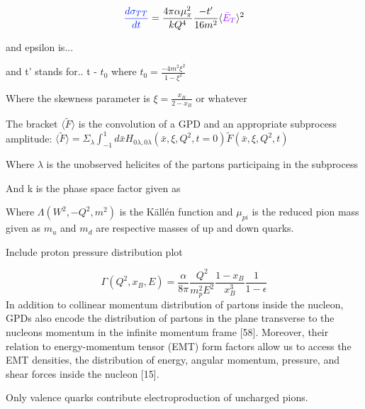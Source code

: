     
    \begin{equation}
        \textcolor{sigmaTT}{\frac{d\sigma_{TT}}{dt}} = 
        \frac{4\pi\alpha \mu_{\pi}^2}{kQ^4}
        \frac{-t'}{16m^2}
        \langle \GPDETbarEQ \rangle^2   
    \end{equation} 
        
    

    and epsilon is... 
    
    and t' stands for.. t - $t_0$ where $t_0 = \frac{-4m^2\xi^2}{1-\xi^2}$
    
    
    Where the skewness parameter is $\xi = \frac{x_B}{2-x_B}$ or whatever
    

    The bracket $\langle \tilde{F} \rangle$ is the convolution of a GPD and an appropriate subprocess amplitude:
    $
    \langle \tilde{F} \rangle =  \Sigma_{\lambda} \int_{-1}^{1} d\bar{x}H_{0\lambda,0\lambda}\left( \bar{x}, \xi, Q^2, t=0  \right)\tilde{F}\left( \bar{x}, \xi, Q^2, t  \right)\   
    $ 


    Where $\lambda$ is the unobserved helicites of the partons participaing in the subprocess
    
    
    
    
    And k is the phase space factor given as 
     \scalebox{0.7}{%
     $           k = 16\pi \left( W^2 -m^2)\sqrt{\Lambda(W^2,-Q^2,m^2)} \right)$ 
    }
    
        Where $\Lambda(W^2,-Q^2,m^2)$ is the Källén function and $\mu_{pi}$ is the reduced pion mass given as 
    $m_u$ and $m_d$ are respective masses of up and down quarks.


        Include proton pressure distribution plot

      

    \begin{equation}
                 \Gamma (Q^2, x_B, E) = \frac{\alpha}{8\pi} \frac{Q^2}{m^2_pE^2}\frac{1-x_B}{x_B^3}\frac{1}{1-\epsilon}
    \end{equation}
In addition to collinear momentum distribution of partons inside the
nucleon, GPDs also encode the distribution of partons in the plane transverse to
the nucleons momentum in the infinite momentum frame [58]. Moreover, their
relation to energy-momentum tensor (EMT) form factors allow us to access the
EMT densities, the distribution of energy, angular momentum, pressure, and shear
forces inside the nucleon [15].

Only valence quarks contribute electroproduction of uncharged pions.

